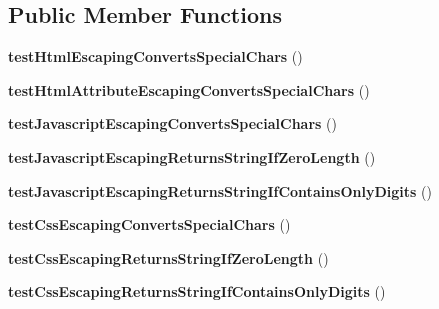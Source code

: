 \subsection*{Public Member Functions}
\begin{DoxyCompactItemize}
\item 
{\bfseries test\+Html\+Escaping\+Converts\+Special\+Chars} ()\hypertarget{classTwig__Test__EscapingTest_a145cf1fff8e0918d8cb3f101bd108ec5}{}\label{classTwig__Test__EscapingTest_a145cf1fff8e0918d8cb3f101bd108ec5}

\item 
{\bfseries test\+Html\+Attribute\+Escaping\+Converts\+Special\+Chars} ()\hypertarget{classTwig__Test__EscapingTest_a92475a237e333d220df348794cab5b76}{}\label{classTwig__Test__EscapingTest_a92475a237e333d220df348794cab5b76}

\item 
{\bfseries test\+Javascript\+Escaping\+Converts\+Special\+Chars} ()\hypertarget{classTwig__Test__EscapingTest_accdeafefb6d61a94b7d1095a92989f51}{}\label{classTwig__Test__EscapingTest_accdeafefb6d61a94b7d1095a92989f51}

\item 
{\bfseries test\+Javascript\+Escaping\+Returns\+String\+If\+Zero\+Length} ()\hypertarget{classTwig__Test__EscapingTest_a1ad19ba35f246dd862dfbe49e3cd9526}{}\label{classTwig__Test__EscapingTest_a1ad19ba35f246dd862dfbe49e3cd9526}

\item 
{\bfseries test\+Javascript\+Escaping\+Returns\+String\+If\+Contains\+Only\+Digits} ()\hypertarget{classTwig__Test__EscapingTest_a4366c1c5590d9e54072ea0dbb357c9e2}{}\label{classTwig__Test__EscapingTest_a4366c1c5590d9e54072ea0dbb357c9e2}

\item 
{\bfseries test\+Css\+Escaping\+Converts\+Special\+Chars} ()\hypertarget{classTwig__Test__EscapingTest_aa326d64f4bf9ff4753d0d8fc9b8587ef}{}\label{classTwig__Test__EscapingTest_aa326d64f4bf9ff4753d0d8fc9b8587ef}

\item 
{\bfseries test\+Css\+Escaping\+Returns\+String\+If\+Zero\+Length} ()\hypertarget{classTwig__Test__EscapingTest_a8b45bd8757746acf841313fbe5a57a73}{}\label{classTwig__Test__EscapingTest_a8b45bd8757746acf841313fbe5a57a73}

\item 
{\bfseries test\+Css\+Escaping\+Returns\+String\+If\+Contains\+Only\+Digits} ()\hypertarget{classTwig__Test__EscapingTest_ae042b02301f0ab410ebc35f200df5450}{}\label{classTwig__Test__EscapingTest_ae042b02301f0ab410ebc35f200df5450}


\end{DoxyCompactItemize}
